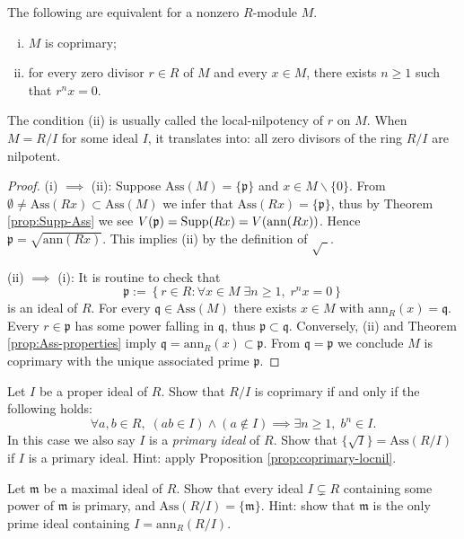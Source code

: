 \begin{proposition}\label{prop:coprimary-locnil}
	The following are equivalent for a nonzero $R$-module $M$.
	\begin{enumerate}[(i)]
		\item $M$ is coprimary;
		\item for every zero divisor $r \in R$ of $M$ and every $x \in M$, there exists $n \geq 1$ such that $r^n x = 0$.
	\end{enumerate}
\end{proposition}
The condition (ii) is usually called the local-nilpotency of $r$ on $M$. When $M = R/I$ for some ideal $I$, it translates into: all zero divisors of the ring $R/I$ are nilpotent.
\begin{proof}
	(i) $\implies$ (ii): Suppose $\text{Ass}(M) = \{ \mathfrak{p}\}$ and $x \in M \smallsetminus \{0\}$. From $\emptyset \neq \text{Ass}(Rx) \subset \text{Ass}(M)$ we infer that $\text{Ass}(Rx) = \{\mathfrak{p}\}$, thus by Theorem \ref{prop:Supp-Ass} we see $V(\mathfrak{p}) = \operatorname{Supp}(Rx) = V(\text{ann}(Rx))$. Hence $\mathfrak{p} = \sqrt{\text{ann}(Rx)}$. This implies (ii) by the definition of $\sqrt{\hspace{5pt}}$.
	
	(ii) $\implies$ (i): It is routine to check that
	\[ \mathfrak{p} := \left\{ r \in R: \forall x \in M \; \exists n \geq 1, \; r^n x = 0 \right\} \]
	is an ideal of $R$. For every $\mathfrak{q} \in \text{Ass}(M)$ there exists $x \in M$ with $\text{ann}_R(x) = \mathfrak{q}$. Every $r \in \mathfrak{p}$ has some power falling in $\mathfrak{q}$, thus $\mathfrak{p} \subset \mathfrak{q}$. Conversely, (ii) and Theorem \ref{prop:Ass-properties} imply $\mathfrak{q} = \text{ann}_R(x) \subset \mathfrak{p}$. From $\mathfrak{q}=\mathfrak{p}$ we conclude $M$ is coprimary with the unique associated prime $\mathfrak{p}$.
\end{proof}

\begin{exercise}\label{ex:primary-ideal}
	Let $I$ be a proper ideal of $R$. Show that $R/I$ is coprimary if and only if the following holds:
	\[ \forall a,b \in R, \; (ab \in I) \wedge (a \notin I) \implies \exists n \geq 1, \; b^n \in I. \]
	In this case we also say $I$ is a \emph{primary ideal} of $R$. Show that $\{\sqrt{I}\} = \text{Ass}(R/I)$ if $I$ is a primary ideal. Hint: apply Proposition \ref{prop:coprimary-locnil}.
\end{exercise}

\begin{exercise}\label{ex:maximal-primary}
	Let $\mathfrak{m}$ be a maximal ideal of $R$. Show that every ideal $I \subsetneq R$ containing some power of $\mathfrak{m}$ is primary, and $\text{Ass}(R/I) = \{\mathfrak{m}\}$. Hint: show that $\mathfrak{m}$ is the only prime ideal containing $I = \text{ann}_R(R/I)$.
\end{exercise}

